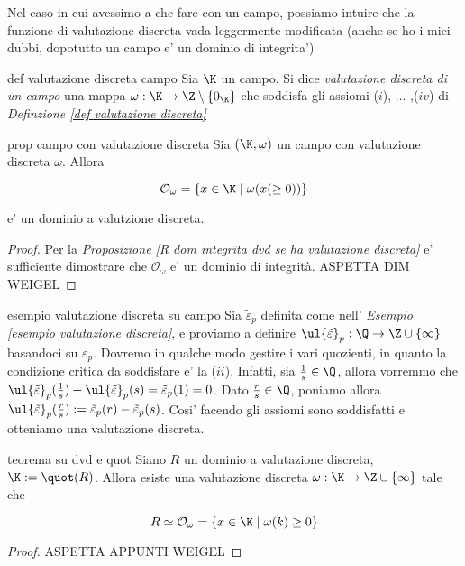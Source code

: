 \noindent Nel caso in cui avessimo a che fare con un campo, possiamo intuire che la funzione di valutazione discreta vada leggermente modificata
(anche se ho i miei dubbi, dopotutto un campo e' un dominio di integrita')

\begin{defn}{def valutazione discreta campo}
  Sia $\K$ un campo. Si dice \emph{valutazione discreta di un campo} una mappa 
  $\omega : \K \rightarrow \Z \setminus \{ 0_{\K} \}$ che soddisfa gli assiomi ($i$), ... ,($iv$) di 
  \emph{Definzione \ref{def valutazione discreta}} 
\end{defn}

\begin{prop}[]{prop campo con valutazione discreta}
  Sia $(\K, \omega)$ un campo con valutazione discreta $\omega$. Allora

  \[ \mathcal{O}_{\omega} = \{ x \in \K \mid \omega(x( \geq 0)) \} \]

  \noindent e' un dominio a valutzione discreta.
\end{prop}
\begin{proof}
  Per la \emph{Proposizione \ref{R dom integrita dvd se ha valutazione discreta}} e' sufficiente dimostrare che $\mathcal{O}_{\omega}$ e' 
  un dominio di integrità.
  ASPETTA DIM WEIGEL
\end{proof}

\begin{example}{esempio valutazione discreta su campo}
  Sia $\tilde{\varepsilon}_p$ definita come nell' \emph{Esempio \ref{esempio valutazione discreta}}, e proviamo a definire
  $\ul{\tilde{\varepsilon}}_p : \Q \rightarrow \Z \cup \{ \infty \}$ basandoci su $\tilde{\varepsilon}_p$. Dovremo in qualche modo gestire i vari quozienti, 
  in quanto la condizione critica da soddisfare e' la ($ii$). Infatti, sia $\frac{1}{s} \in \Q$, allora vorremmo che 
  $\ul{\tilde{\varepsilon}}_p(\frac{1}{s}) + \ul{\tilde{\varepsilon}}_p(s) = \tilde{\varepsilon}_p(1) = 0$. Dato $\frac{r}{s} \in \Q$, poniamo allora
  \mbox{$\ul{\tilde{\varepsilon}}_p(\frac{r}{s}) := \tilde{\varepsilon}_p(r) - \tilde{\varepsilon}_p(s)$}. Cosi' facendo gli assiomi sono 
  soddisfatti e otteniamo una valutazione discreta.
\end{example}

\begin{teo}[]{teorema su dvd e quot}
  Siano $R$ un dominio a valutazione discreta, $\K := \quot(R)$. Allora esiste una valutazione discreta $\omega : \K \rightarrow \Z \cup \{ \infty \}$ 
  tale che 

  \[ R \simeq \mathcal{O}_{\omega} = \{ x \in \K \mid \omega(k) \geq 0 \} \]
\end{teo}
\begin{proof}
  ASPETTA APPUNTI WEIGEL
\end{proof}